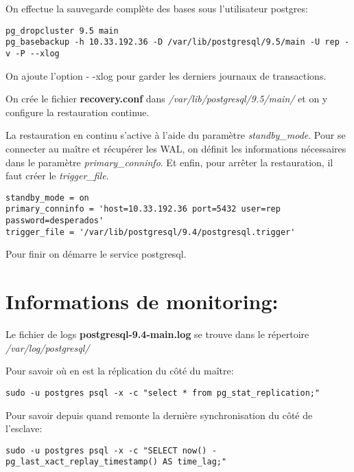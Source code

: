 \vspace{2mm}

On effectue la sauvegarde complète des bases sous l'utilisateur postgres:

\smallskip
\begin{Verbatim}[frame=single,framerule=1mm,framesep=3mm,rulecolor=\color{brown}]
pg_dropcluster 9.5 main
pg_basebackup -h 10.33.192.36 -D /var/lib/postgresql/9.5/main -U rep -v -P --xlog
\end{Verbatim}
On ajoute l'option - -xlog pour garder les derniers journaux de transactions.

\vspace{2mm}

On crée le fichier \textbf{recovery.conf} dans \textit{/var/lib/postgresql/9.5/main/} et on y configure la restauration continue.

La restauration en continu s'active à l'aide du paramètre \textit{standby\_mode}. Pour se connecter au maître et récupérer les WAL, on définit les informations nécessaires dans le paramètre \textit{primary\_conninfo}. Et enfin, pour arrêter la restauration, il faut créer le \textit{trigger\_file}.
\smallskip
\begin{Verbatim}[frame=single,framerule=1mm,framesep=3mm,rulecolor=\color{brown}]
standby_mode = on 
primary_conninfo = 'host=10.33.192.36 port=5432 user=rep password=desperados' 
trigger_file = '/var/lib/postgresql/9.4/postgresql.trigger' 
\end{Verbatim}

Pour finir on démarre le service postgresql.

\section{Informations de monitoring:}

Le fichier de logs \textbf{postgresql-9.4-main.log} se trouve dans le répertoire \textit{/var/log/postgresql/}

\vspace{4mm}

Pour savoir où en est la réplication du côté du maître:
\smallskip
\begin{Verbatim}[frame=single,framerule=1mm,framesep=3mm,rulecolor=\color{brown}]
sudo -u postgres psql -x -c "select * from pg_stat_replication;"
\end{Verbatim}

\vspace{4mm}

Pour savoir depuis quand remonte la dernière synchronisation du côté de l'esclave:
\smallskip
\begin{Verbatim}[frame=single,framerule=1mm,framesep=3mm,rulecolor=\color{brown}]
sudo -u postgres psql -x -c "SELECT now() - pg_last_xact_replay_timestamp() AS time_lag;"
\end{Verbatim}

